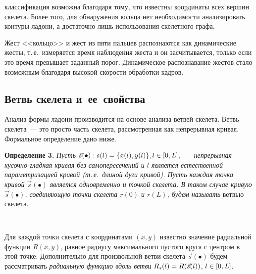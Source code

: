 \begin{multicols}{2}
\smallskip
\addtocounter{figure}{1}


\noindent
 классификация возможна благодаря тому, что известны координаты всех вершин скелета.
Более того, для обнаружения кольца нет необходимости анализировать контуры ладони, а 
достаточно лишь использования скелетного графа.

Жест <<кольцо>> и жест из пяти пальцев распознаются как динамические жесты,
т.\,е.\ измеряется время наблюдения жеста и он засчитывается, только если 
это время превышает заданный порог.
Динамическое распознавание жестов стало возможным благодаря высокой 
скорости обработки кадров.

\subsection{Ветвь скелета и~ее~свойства}\label{seq:GestureRecognition_SkeletonBranch}

Анализ формы ладони производится на основе анализа ветвей скелета.
Ветвь скелета~--- это прос\-то часть скелета, рассмотренная как непрерывная кривая.
Формальное определение дано ниже.

\medskip

\noindent
\textbf{Определение 3.} %
\textit{Пусть $\vec s(\bullet): s(l) \hm= \{ x(l), y(l) \}, l \hm\in [0, L]$,~--- 
непрерывная ку\-соч\-но-глад\-кая кривая без самопересечений и $l$ является 
естественной па\-ра\-мет\-ри\-за\-ци\-ей кривой (т.\,е.\ длиной дуги кривой).
Пусть каждая точка кривой $\vec s(\bullet)$ является одновременно и точкой скелета.
В таком случае кривую $\vec s(\bullet)$, 
соединяющую точки скелета $r(0)$ и $r(L)$, будем называть} ветвью скелета.

\begin{figure*}[b] %
\vspace*{-6pt}
 \begin{center}
 \mbox{%
 \epsfxsize=162.248mm
 }
 \end{center}
 \vspace*{-12pt}
\end{figure*}

Для каждой точки скелета с координатами $(x,y)$ известно значение радиальной 
функции $R(x,y)$, равное радиусу максимального пустого круга с центром в этой точке.
Дополнительно для произвольной ветви скелета $\vec s(\bullet)$ будем рассматривать 
\textit{радиальную функцию вдоль ветви} $R_{s}(l) \hm= R(\vec s(l))$, $l \hm\in [0, L]$.


\end{multicols}
